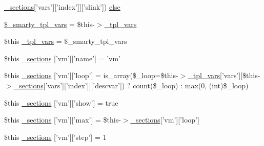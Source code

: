 \begin{DoxyCompactItemize}
\hyperlink{_06_06127_05_06_0612781687_05pkgelementindex_8tpl_8php_a9e3d26b39edfe29c3f29b8035ef33828}{\-\_\-sections}\mbox{[}'vars'\mbox{]}\mbox{[}'index'\mbox{]}\mbox{]}\mbox{[}'slink'\mbox{]}) \hyperlink{default_234d6fa4bfd5eef6424a9ddc74a166350_2_06_06708_05_06_06708843835_05var_8tpl_8php_a8eb94d762b47d6b59a228e85c335fe0f}{else}
\item 
\hyperlink{default_234d6fa4bfd5eef6424a9ddc74a166350_2_06_06708_05_06_06708843835_05var_8tpl_8php_a14dde6d029d65a879ee7bc1ebc398dd1}{\$\-\_\-smarty\-\_\-tpl\-\_\-vars} = \$this-\/$>$\hyperlink{_06_06127_05_06_0612781687_05pkgelementindex_8tpl_8php_a4a4846d8e68d455590131a05697f67a3}{\-\_\-tpl\-\_\-vars}
\item 
\$this \hyperlink{default_234d6fa4bfd5eef6424a9ddc74a166350_2_06_06708_05_06_06708843835_05var_8tpl_8php_a4a4846d8e68d455590131a05697f67a3}{\-\_\-tpl\-\_\-vars} = \$\-\_\-smarty\-\_\-tpl\-\_\-vars
\item 
\$this \hyperlink{default_234d6fa4bfd5eef6424a9ddc74a166350_2_06_06708_05_06_06708843835_05var_8tpl_8php_a8815c04e0d3e2e64606b802ae35eab02}{\-\_\-sections} \mbox{[}'vm'\mbox{]}\mbox{[}'name'\mbox{]} = 'vm'
\item 
\$this \hyperlink{default_234d6fa4bfd5eef6424a9ddc74a166350_2_06_06708_05_06_06708843835_05var_8tpl_8php_a48faf75de18919893be4beb34ff8962c}{\-\_\-sections} \mbox{[}'vm'\mbox{]}\mbox{[}'loop'\mbox{]} = is\-\_\-array(\$\-\_\-loop=\$this-\/$>$\hyperlink{_06_06127_05_06_0612781687_05pkgelementindex_8tpl_8php_a4a4846d8e68d455590131a05697f67a3}{\-\_\-tpl\-\_\-vars}\mbox{[}'vars'\mbox{]}\mbox{[}\$this-\/$>$\hyperlink{_06_06127_05_06_0612781687_05pkgelementindex_8tpl_8php_a9e3d26b39edfe29c3f29b8035ef33828}{\-\_\-sections}\mbox{[}'vars'\mbox{]}\mbox{[}'index'\mbox{]}\mbox{]}\mbox{[}'descvar'\mbox{]}) ? count(\$\-\_\-loop) \-: max(0, (int)\$\-\_\-loop)
\item 
\$this \hyperlink{default_234d6fa4bfd5eef6424a9ddc74a166350_2_06_06708_05_06_06708843835_05var_8tpl_8php_a0c0e56e7807182d378d09ef0cdeee34e}{\-\_\-sections} \mbox{[}'vm'\mbox{]}\mbox{[}'show'\mbox{]} = true
\item 
\$this \hyperlink{default_234d6fa4bfd5eef6424a9ddc74a166350_2_06_06708_05_06_06708843835_05var_8tpl_8php_ae52a39cb292b0d649e41d15106638480}{\-\_\-sections} \mbox{[}'vm'\mbox{]}\mbox{[}'max'\mbox{]} = \$this-\/$>$\hyperlink{_06_06127_05_06_0612781687_05pkgelementindex_8tpl_8php_a9e3d26b39edfe29c3f29b8035ef33828}{\-\_\-sections}\mbox{[}'vm'\mbox{]}\mbox{[}'loop'\mbox{]}
\item 
\$this \hyperlink{default_234d6fa4bfd5eef6424a9ddc74a166350_2_06_06708_05_06_06708843835_05var_8tpl_8php_a4c1a69cc7a45a7169d0b1e8b5f96e635}{\-\_\-sections} \mbox{[}'vm'\mbox{]}\mbox{[}'step'\mbox{]} = 1

\end{DoxyCompactItemize}
